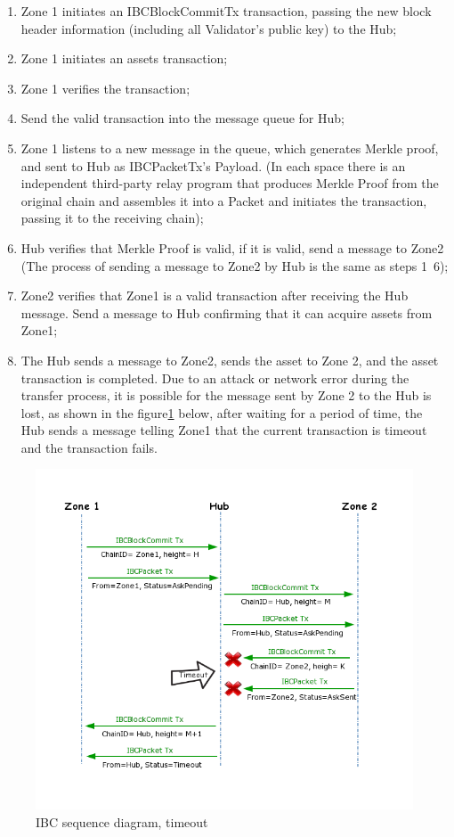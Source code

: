 \begin{enumerate}
    \item  Zone 1 initiates an IBCBlockCommitTx transaction, passing the new block header information (including all Validator's public key) to the Hub;
    \item  Zone 1 initiates an assets transaction;
    \item Zone 1 verifies the transaction;
    \item Send the valid transaction into the message queue for Hub;
    \item Zone 1 listens to a new message in the queue, which generates Merkle proof, and sent to Hub as IBCPacketTx's Payload. (In each space there is an independent third-party relay program that produces Merkle Proof from the original chain and assembles it into a Packet and initiates the transaction, passing it to the receiving chain);
    \item Hub verifies that Merkle Proof is valid, if it is valid, send a message to Zone2 (The process of sending a message to Zone2 by Hub is the same as steps 1~6);
    \item Zone2 verifies that Zone1 is a valid transaction after receiving the Hub message. Send a message to Hub confirming that it can acquire assets from Zone1;
    \item The Hub sends a message to Zone2, sends the asset to Zone 2, and the asset transaction is completed.
\noindent Due to an attack or network error during the transfer process, it is possible for the message sent by Zone 2 to the Hub is lost, as shown in the figure\ref{fig:timeout} below, after waiting for a period of time, the Hub sends a message telling Zone1 that the current transaction is timeout and the transaction fails.
\end{enumerate}
        \begin{figure}[H]
        \includegraphics[width=1\textwidth]{./figures/IBC_timeout.png}
        \centering
        \caption{IBC sequence diagram, timeout}%
        \centering
        \label{fig:timeout}
        \end{figure}
        
